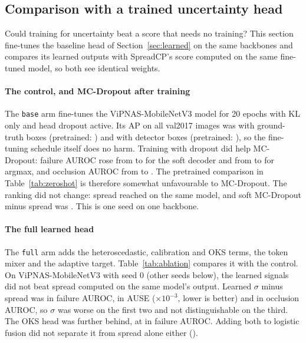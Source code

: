 \documentclass[preprint,11pt]{elsarticle}
\newcommand{\method}{SpreadCP}
\begin{document}
\subsection{Comparison with a trained uncertainty head}\label{sec:headcmp}

Could training for uncertainty beat a score that needs no training? This section fine-tunes the
baseline head of Section~\ref{sec:learned} on the same backbones and compares its learned outputs
with \method{}'s score computed on the same fine-tuned model, so both see identical weights.

\paragraph{The control, and MC-Dropout after training} The \texttt{base} arm fine-tunes the
ViPNAS-MobileNetV3 model for 20 epochs with KL only and head dropout active. Its AP on all val2017
images was \ApGtFtMbvThreeBaseSZero{} with ground-truth boxes (pretrained: \ApGtZsSimccMbvThree{}) and
\ApDetFtMbvThreeBaseSZero{} with detector boxes (pretrained: \ApDetZsSimccMbvThree{}), so the
fine-tuning schedule itself does no harm. Training with dropout did help MC-Dropout: failure AUROC rose
from \FaZsSimccMbvThreeMcSoft{} to \FaFtMbvThreeBaseSZeroMcSoft{} for the soft decoder and from
\FaZsSimccMbvThreeMc{} to \FaFtMbvThreeBaseSZeroMc{} for argmax, and occlusion AUROC from
\OaZsSimccMbvThreeMcSoft{} to \OaFtMbvThreeBaseSZeroMcSoft{}. The pretrained comparison in
Table~\ref{tab:zeroshot} is therefore somewhat unfavourable to MC-Dropout. The ranking did not change:
spread reached \FaFtMbvThreeBaseSZeroDist{} on the same model, and soft MC-Dropout minus spread was
\DfaFtMbvThreeBaseSZeroMcSoftMinusDist{}. This is one seed on one backbone.

\paragraph{The full learned head} The \texttt{full} arm adds the heteroscedastic, calibration and OKS
terms, the token mixer and the adaptive target. Table~\ref{tab:ablation} compares it with the control.
On ViPNAS-MobileNetV3 with seed 0 (other seeds below), the learned signals did not beat spread computed
on the same model's output. Learned $\sigma$ minus spread was \DfaFtMbvThreeFullSZeroHetMinusDist{} in failure
AUROC, \DauseFtMbvThreeFullSZeroHetMinusDist{} in AUSE ($\times 10^{-3}$, lower is better) and
\DoaFtMbvThreeFullSZeroHetMinusDist{} in occlusion AUROC, so $\sigma$ was worse on the first two and
not distinguishable on the third. The OKS head was further behind, at
\DfaFtMbvThreeFullSZeroOksMinusDist{} in failure AUROC. Adding both to logistic fusion did not separate
it from spread alone either (\DfaFtMbvThreeFullSZeroFusionMinusDist{}).
\end{document}
